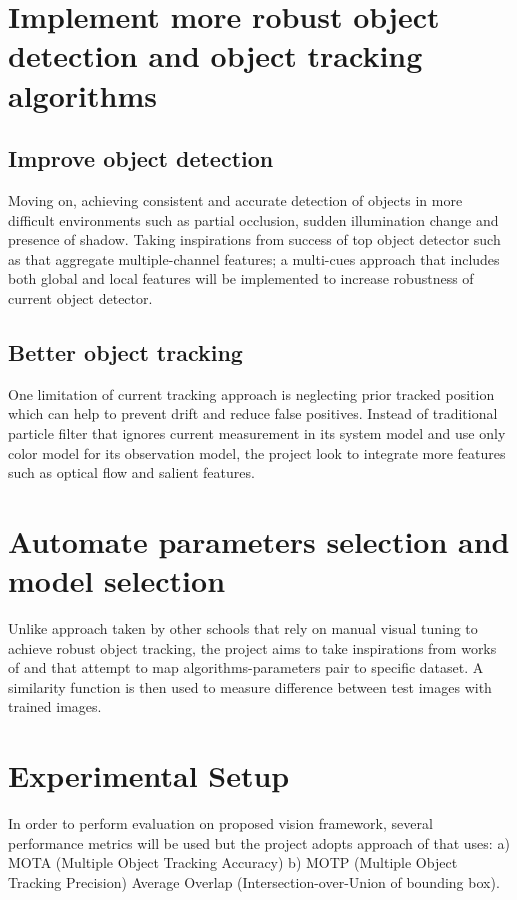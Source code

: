 \documentclass[fypca]{socreport}
\begin{document}
\section{Implement more robust object detection and object tracking algorithms}

\subsection{Improve object detection}
Moving on, achieving consistent and accurate detection of objects in more difficult environments such as partial occlusion, sudden illumination change and presence of shadow. Taking inspirations from success of top object detector such as  that aggregate multiple-channel features; a multi-cues approach that includes both global and local features will be implemented to increase robustness of current object detector.

\subsection{Better object tracking}
One limitation of current tracking approach is neglecting prior tracked position which can help to prevent drift and reduce false positives. Instead of traditional particle filter that ignores current measurement in its system model and use only color model for its observation model, the project look to integrate more features such as optical flow and salient features. 

\section{Automate parameters selection and model selection}
Unlike approach taken by other schools that rely on manual visual tuning to achieve robust object tracking, the project aims to take inspirations from works of \cite{Zhang2016} and \cite{collins2005online} that attempt to map algorithms-parameters pair to specific dataset. A similarity function is then used to measure difference between test images with trained images.

\section{Experimental Setup}
In order to perform evaluation on proposed vision framework, several performance metrics will be used but the project adopts approach of  that uses: a) MOTA (Multiple Object Tracking Accuracy) b) MOTP (Multiple Object Tracking Precision) Average Overlap (Intersection-over-Union of bounding box). 
\end{document}
